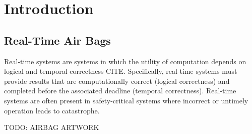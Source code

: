 \section{Introduction}   \label{chap:introduction}


\subsection{Real-Time Air Bags}
Real-time systems are systems in which the utility of computation depends on logical and temporal correctness CITE.
Specifically, real-time systems must provide results that are computationally correct (logical correctness) and completed before the associated deadline (temporal correctness).
Real-time systems are often present in safety-critical systems where incorrect or untimely operation leads to catastrophe.

TODO: AIRBAG ARTWORK

